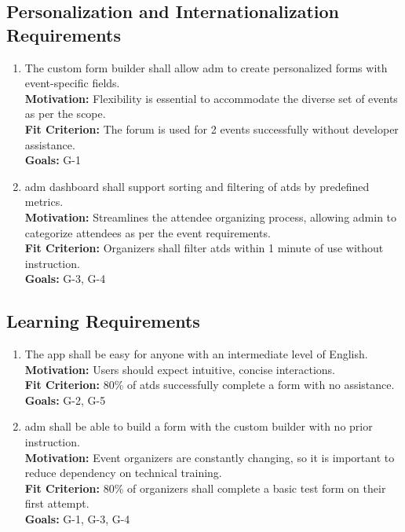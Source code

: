 \documentclass[12pt]{article}
\begin{document}
\subsection{Personalization and Internationalization Requirements}
\begin{enumerate}[label=\bfseries PI-\arabic*, wide=0pt, leftmargin=*, ref=\bfseries PI-\arabic*]
  \item \label{PI1}The custom form builder shall allow \gls{adm} to create personalized forms with event-specific fields.\\[2mm]
    {\bf Motivation:} Flexibility is essential to accommodate the diverse set of events as per the scope.\\
    {\bf Fit Criterion:} The forum is used for 2 events successfully without developer assistance.\\
    {\bf Goals:} G-1
  \item \label{PI2} \Gls{adm} dashboard shall support sorting and filtering of \glspl{atd} by predefined metrics.\\[2mm]
    {\bf Motivation:} Streamlines the attendee organizing process, allowing admin to categorize attendees as per the event requirements.\\
    {\bf Fit Criterion:} Organizers shall filter \glspl{atd} within 1 minute of use without instruction.\\
    {\bf Goals:} G-3, G-4
\end{enumerate}

\subsection{Learning Requirements}
\begin{enumerate}[label=\bfseries LR-\arabic*:, wide=0pt, leftmargin=*, ref=\bfseries LR-\arabic*]
  \item \label{LR1} The app shall be easy for anyone with an intermediate level of English.\\[2mm]
    {\bf Motivation:} Users should expect intuitive, concise interactions.\\
    {\bf Fit Criterion:} 80\% of \glspl{atd} successfully complete a form with no assistance.\\
    {\bf Goals:} G-2, G-5
  \item \label{LR2} \Gls{adm} shall be able to build a form with the custom builder with no prior instruction.\\[2mm]
    {\bf Motivation:} Event organizers are constantly changing, so it is important to reduce dependency on technical training.\\
    {\bf Fit Criterion:} 80\% of organizers shall complete a basic test form on their first attempt.\\
    {\bf Goals:} G-1, G-3, G-4
\end{enumerate}
\end{document}

